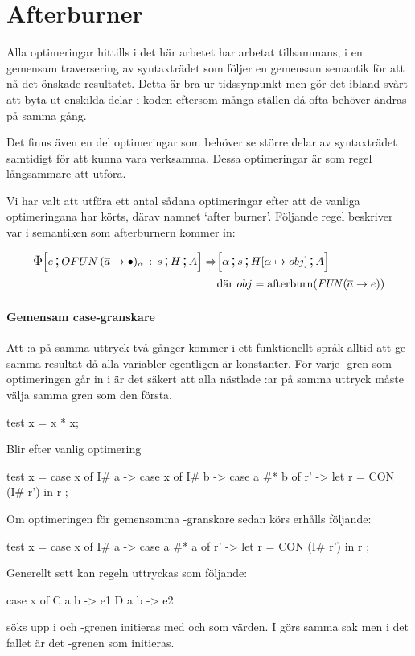 \documentclass[../Optimise]{subfiles}
\begin{document}
\section{Afterburner}
\label{sec:Afterburner}

Alla optimeringar hittills i det här arbetet har arbetat tillsammans, i en gemensam
traversering av syntaxträdet som följer en gemensam semantik för att nå det önskade resultatet. 
Detta är bra ur tidssynpunkt men gör det ibland svårt att byta ut enskilda delar i koden
eftersom många ställen då ofta behöver ändras på samma gång.

Det finns även en del optimeringar som behöver se större delar av syntaxträdet
samtidigt för att kunna vara verksamma. Dessa optimeringar är som regel långsammare att utföra.

Vi har valt att utföra ett antal sådana optimeringar efter att de vanliga
optimeringana har körts, därav namnet `after burner'. Följande regel beskriver
var i semantiken som afterburnern kommer in:

\begin{align*}
\CBNIRR{\cOFUN{\many{a}}{\alpha}s}HAe \Rightarrow & \CBNMC{\alpha}{s}{\heap{\alpha}{obj}}A \\
 & \text{där } obj = \text{afterburn} (\FUN{\many{a}}e)
\end{align*}

\paragraph{Gemensam case-granskare} 
Att :a på samma uttryck två gånger kommer i ett funktionellt språk alltid att ge
samma resultat då alla variabler egentligen är konstanter. För varje -gren
som optimeringen går in i är det säkert att alla nästlade :ar på samma uttryck måste välja samma
gren som den första.

\begin{codeEx}
test x = x * x;
\end{codeEx}

Blir efter vanlig optimering

\begin{codeEx}
test x = case x of
            { I# a -> case x of
                { I# b -> case a #* b of
                    { r' -> let r = CON (I# r')
                            in r
            }   }   };
\end{codeEx}

Om optimeringen för gemensamma -granskare sedan körs erhålls följande:
\begin{codeEx}
test x = case x of
            { I# a -> case a #* a of
                { r' -> let r = CON (I# r')
                        in r
            }   };
\end{codeEx}

Generellt sett kan regeln uttryckas som följande:
\begin{codeEx}
case x of
    C a b -> e1
    D a b -> e2
\end{codeEx}

 söks upp i  och 
-grenen initieras med  och  som värden. I  görs samma 
sak men i det fallet är det -grenen som initieras.
\end{document}
